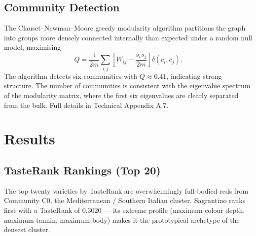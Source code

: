 \documentclass[11pt]{article}
\begin{document}
\subsection{Community Detection}
The Clauset--Newman--Moore greedy modularity algorithm partitions the graph into groups more densely connected internally than expected under a random null model, maximising
\[
Q = \frac{1}{2m} \sum_{i,j} \left[ W_{ij} - \frac{s_i s_j}{2m} \right] \delta(c_i, c_j).
\]
The algorithm detects six communities with $Q \approx 0.41$, indicating strong structure. The number of communities is consistent with the eigenvalue spectrum of the modularity matrix, where the first six eigenvalues are clearly separated from the bulk. Full details in Technical Appendix A.7.

\section{Results}

\subsection{TasteRank Rankings (Top 20)}
The top twenty varieties by TasteRank are overwhelmingly full-bodied reds from Community C0, the Mediterranean / Southern Italian cluster. Sagrantino ranks first with a TasteRank of 0.3020 --- its extreme profile (maximum colour depth, maximum tannin, maximum body) makes it the prototypical archetype of the densest cluster.
\end{document}
